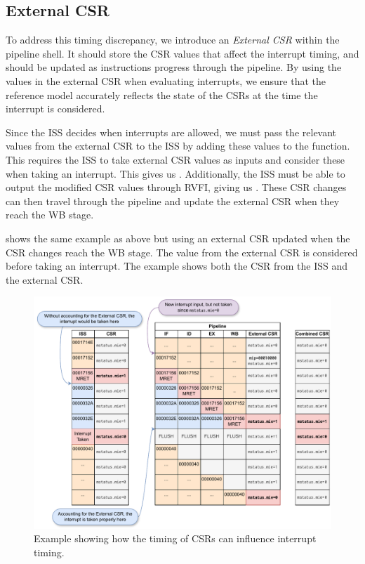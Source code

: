 \subsection{External CSR}

To address this timing discrepancy, we introduce an \textit{External CSR} within the pipeline shell. It should store the CSR values that affect the interrupt timing, and should be updated as instructions progress through the pipeline. By using the values in the external CSR when evaluating interrupts, we ensure that the reference model accurately reflects the state of the CSRs at the time the interrupt is considered.

Since the ISS decides when interrupts are allowed, we must pass the relevant values from the external CSR to the ISS by adding these values to the  function. This requires the ISS to take external CSR values as inputs and consider these when taking an interrupt. This gives us . Additionally, the ISS must be able to output the modified CSR values through RVFI, giving us .
These CSR changes can then travel through the pipeline and update the external CSR when they reach the WB stage.


 shows the same example as above but using an external CSR updated when the CSR changes reach the WB stage. The value from the external CSR is considered before taking an interrupt. The example shows both the CSR from the ISS and the external CSR.

\begin{figure}
    \centering
    \includegraphics[width=1\linewidth]{figures/mret_example.pdf}
    \caption{Example showing how the timing of CSRs can influence interrupt timing.}
    \label{fig:mret_example}
\end{figure}

